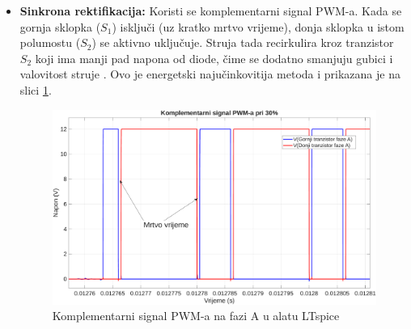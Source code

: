 \documentclass[diplomskirad]{fer}
\begin{document}
\begin{itemize}
\begin{itemize}
		      \item \textbf{Sinkrona rektifikacija:} Koristi se komplementarni signal
		            PWM-a. Kada se gornja sklopka ($S_1$) isključi (uz kratko mrtvo
		            vrijeme), donja sklopka u istom polumostu ($S_2$) se aktivno uključuje.
		            Struja tada recirkulira kroz tranzistor $S_2$ koji ima manji pad napona
		            od diode, čime se dodatno smanjuju gubici i valovitost struje \cite{TI2015}. Ovo je
		            energetski najučinkovitija metoda i prikazana je na slici
		            \ref{fig:comp_pwm}.
		            \begin{figure}[h!]
			            \centering
			            \includegraphics[width=\textwidth]{csv/comp_ltspice.pdf}
			            \caption{Komplementarni signal PWM-a na fazi A u alatu LTspice}
			            \label{fig:comp_pwm}
		            \end{figure}

	      \end{itemize}
\end{itemize}
\end{document}
